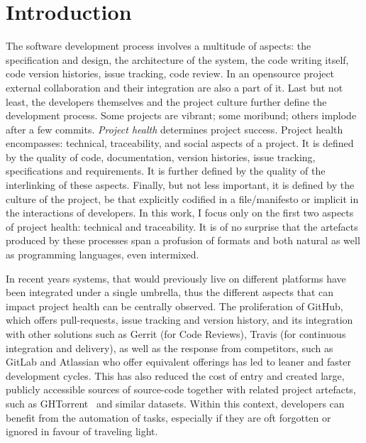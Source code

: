 \chapter{Introduction}
\label{chapter:introduction}

The software development process involves a multitude of aspects: the
specification and design, the architecture of the system, the code writing
itself, code version histories, issue tracking, code review. In an opensource
project external collaboration and their integration are also a part of it. Last
but not least, the developers themselves and the project culture further define
the development process. Some projects are vibrant; some moribund; others
implode after a few commits. \emph{Project health} determines project success.
Project health encompasses: technical, traceability, and social aspects of a
project. It is defined by the quality of code, documentation, version histories,
issue tracking, specifications and requirements. It is further defined by the
quality of the interlinking of these aspects. Finally, but not less important,
it is defined by the culture of the project, be that explicitly codified in a
file/manifesto or implicit in the interactions of developers. In this work, I
focus only on the first two aspects of project health: technical and
traceability. It is of no surprise that the artefacts produced by these
processes span a profusion of formats and both natural as well as programming
languages, even intermixed.

In recent years systems, that would previously live on different platforms have
been integrated under a single umbrella, thus the different aspects that can
impact project health can be centrally observed. The proliferation of GitHub,
which offers pull-requests, issue tracking and version history, and its
integration with other solutions such as Gerrit (for Code Reviews), Travis (for
continuous integration and delivery), as well as the response from competitors,
such as GitLab and Atlassian who offer equivalent offerings has led to leaner and
faster development cycles. This has also reduced the cost of entry and created
large, publicly accessible sources of source-code together with related project
artefacts, such as GHTorrent~\cite{GHTorrent} and similar datasets. Within this context, developers can benefit from the automation of
tasks, especially if they are oft forgotten or ignored in favour of traveling
light. 


